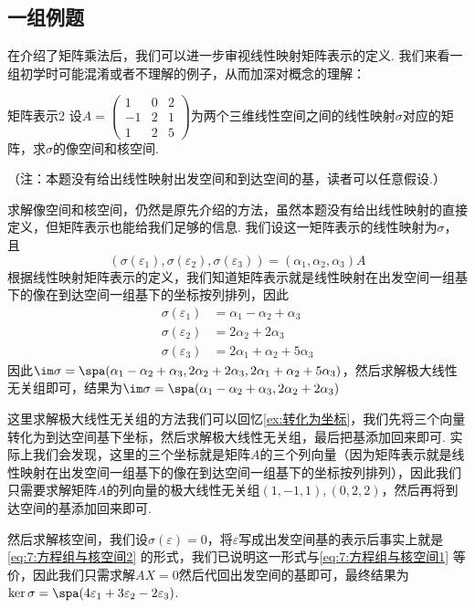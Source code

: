 \subsection{一组例题}

在介绍了矩阵乘法后，我们可以进一步审视线性映射矩阵表示的定义. 我们来看一组初学时可能混淆或者不理解的例子，从而加深对概念的理解：
\begin{example}{}{矩阵表示2}
    设$A=\begin{pmatrix}1 & 0 & 2 \\ -1 & 2 & 1 \\ 1 & 2 & 5\end{pmatrix}$为两个三维线性空间之间的线性映射$\sigma$对应的矩阵，求$\sigma$的像空间和核空间.
\end{example}
（注：本题没有给出线性映射出发空间和到达空间的基，读者可以任意假设.）

\begin{solution}
    求解像空间和核空间，仍然是原先介绍的方法，虽然本题没有给出线性映射的直接定义，但矩阵表示也能给我们足够的信息. 我们设这一矩阵表示的线性映射为$\sigma$，且
    \[(\sigma(\varepsilon_1),\sigma(\varepsilon_2),\sigma(\varepsilon_3))=(\alpha_1,\alpha_2,\alpha_3)A\]
    根据线性映射矩阵表示的定义，我们知道矩阵表示就是线性映射在出发空间一组基下的像在到达空间一组基下的坐标按列排列，因此
    \begin{align*}
        \sigma(\varepsilon_1) & =\alpha_1-\alpha_2+\alpha_3   \\
        \sigma(\varepsilon_2) & =2\alpha_2+2\alpha_3          \\
        \sigma(\varepsilon_3) & =2\alpha_1+\alpha_2+5\alpha_3
    \end{align*}
    因此$\im\sigma=\spa(\alpha_1-\alpha_2+\alpha_3,2\alpha_2+2\alpha_3,2\alpha_1+\alpha_2+5\alpha_3)$，然后求解极大线性无关组即可，结果为$\im\sigma=\spa(\alpha_1-\alpha_2+\alpha_3,2\alpha_2+2\alpha_3)$

    这里求解极大线性无关组的方法我们可以回忆\autoref{ex:转化为坐标}，我们先将三个向量转化为到达空间基下坐标，然后求解极大线性无关组，最后把基添加回来即可. 实际上我们会发现，这里的三个坐标就是矩阵$A$的三个列向量（因为矩阵表示就是线性映射在出发空间一组基下的像在到达空间一组基下的坐标按列排列），因此我们只需要求解矩阵$A$的列向量的极大线性无关组$(1,-1,1),(0,2,2)$，然后再将到达空间的基添加回来即可.

    然后求解核空间，我们设$\sigma(\varepsilon)=0$，将$\varepsilon$写成出发空间基的表示后事实上就是\autoref{eq:7:方程组与核空间2} 的形式，我们已说明这一形式与\autoref{eq:7:方程组与核空间1} 等价，因此我们只需求解$AX=0$然后代回出发空间的基即可，最终结果为$\ker\sigma=\spa(4\varepsilon_1+3\varepsilon_2-2\varepsilon_3)$.
\end{solution}

